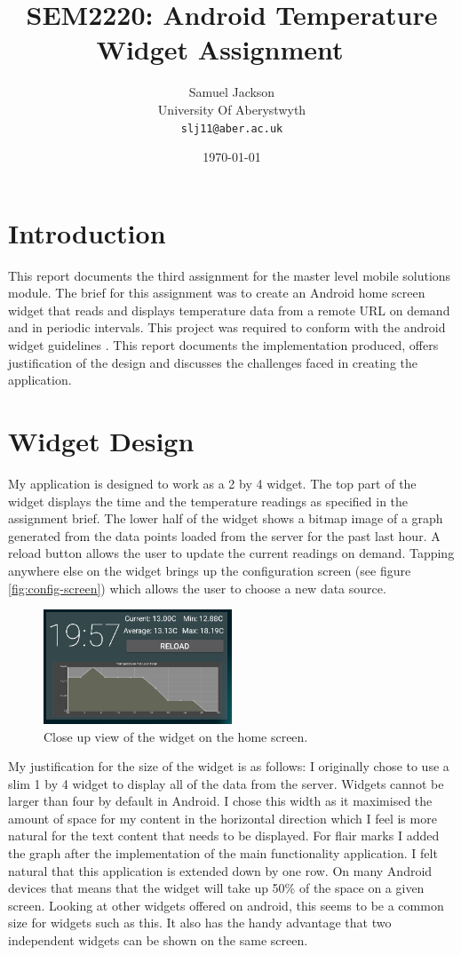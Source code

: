\documentclass[paper=a4, fontsize=11pt]{scrartcl}	%
\title{
	\vspace{-0.5in} 	\usefont{OT1}{bch}{b}{n}
        SEM2220: Android Temperature Widget Assignment \
}
\author{
	\usefont{OT1}{bch}{m}{n} Samuel Jackson
	\\ \usefont{OT1}{bch}{m}{n} University Of Aberystwyth
	\\   \texttt{slj11@aber.ac.uk}
}
\date{\today}
\numberwithin{equation}{section}															%
\numberwithin{figure}{section}																%
\numberwithin{table}{section}
\begin{document}
\maketitle

\clearpage

\section{Introduction}
This report documents the third assignment for the master level mobile solutions module. The brief for this assignment was to create an Android home screen widget that reads and displays temperature data from a remote URL on demand and in periodic intervals. This project was required to conform with the android widget guidelines \cite{android-widget-guidelines}. This report documents the implementation produced, offers justification of the design and discusses the challenges faced in creating the application.

\section{Widget Design}
My application is designed to work as a 2 by 4 widget. The top part of the widget displays the time and the temperature readings as specified in the assignment brief. The lower half of the widget shows a bitmap image of a graph generated from the data points loaded from the server for the past last hour. A reload button allows the user to update the current readings on demand. Tapping anywhere else on the widget brings up the configuration screen (see figure \ref{fig:config-screen}) which allows the user to choose a new data source.

\begin{figure}[ht]
\centering
\includegraphics[width=0.5\textwidth]{img/closeup-screenshot.png}
\caption{Close up view of the widget on the home screen.}
\label{fig:closeup}
\end{figure}

My justification for the size of the widget is as follows: I originally chose to use a slim 1 by 4 widget to display all of the data from the server. Widgets cannot be larger than four by default in Android. I chose this width as it maximised the amount of space for my content in the horizontal direction which I feel is more natural for the text content that needs to be displayed. For flair marks I added the graph after the implementation of the main functionality application. I felt natural that this application is extended down by one row. On many Android devices that means that the widget will take up 50\% of the space on a given screen. Looking at other widgets offered on android, this seems to be a common size for widgets such as this. It also has the handy advantage that two independent widgets can be shown on the same screen. 
\end{document}
